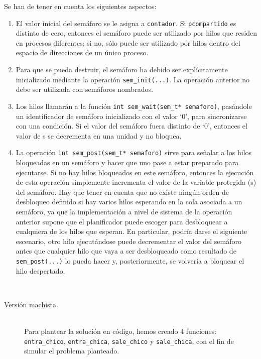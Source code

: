 \begin{ejercicio}
    \begin{observacion} Se han de tener en cuenta los siguientes aspectos:
        \begin{enumerate}
            \item El valor inicial del semáforo se le asigna a \verb|contador|. Si \verb|pcompartido| es distinto de cero, entonces el semáforo puede ser utilizado por hilos que residen en procesos diferentes; si no, sólo puede ser utilizado por hilos dentro del espacio de direcciones de un único proceso.
            \item Para que se pueda destruir, el semáforo ha debido ser explícitamente inicializado mediante la operación \verb|sem_init(...)|. La operación anterior no debe ser utilizada con semáforos nombrados.
            \item Los hilos llamarán a la función \verb|int sem_wait(sem_t* semaforo)|, pasándole un identificador de semáforo inicializado con el valor ‘0’, para sincronizarse con una condición. Si el valor del semáforo fuera distinto de ‘0’, entonces el valor de s se decrementa en una unidad y no bloquea.
            \item La operación \verb|int sem_post(sem_t* semaforo)| sirve para señalar a los hilos bloqueadas en un semáforo y hacer que uno pase a estar preparado para ejecutarse. Si no hay hilos bloqueados en este semáforo, entonces la ejecución de esta operación simplemente incrementa el valor de la variable protegida (s) del semáforo. Hay que tener en cuenta que no existe ningún orden de desbloqueo definido si hay varios hilos esperando en la cola asociada a un semáforo, ya que la implementación a nivel de sistema de la operación anterior supone que el planificador puede escoger para desbloquear a cualquiera de los hilos que esperan. En particular, podría darse el siguiente escenario, otro hilo ejecutándose puede decrementar el valor del semáforo antes que cualquier hilo que vaya a ser desbloqueado como resultado de \verb|sem_post(...)| lo pueda hacer y, posteriormente, se volvería a bloquear el hilo despertado.
        \end{enumerate}
    \end{observacion}~\\

    \begin{description}
        \item [Versión machista.]~\\
            Para plantear la solución en código, hemos creado 4 funciones: \verb|entra_chico|, \verb|entra_chica|, \verb|sale_chico| y \verb|sale_chica|, con el fin de simular el problema planteado.


\end{description}
\end{ejercicio}
